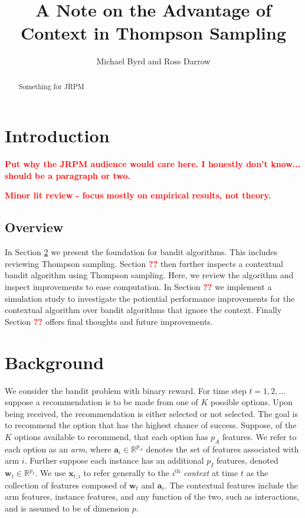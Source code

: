 \documentclass[12pt]{article}
\title{A Note on the Advantage of Context in Thompson Sampling}
\author{Michael Byrd and Ross Darrow}
\newcommand{\bred}[1]{\textbf{\textcolor{red}{#1}}}
\begin{document}
\maketitle

\begin{abstract}
Something for JRPM
\end{abstract}

\section{Introduction}

\bred{Put why the JRPM audience would care here. I honestly don't know... should
be a paragraph or two.}

\bred{Minor lit review - focus mostly on empirical results, not theory.}

\subsection{Overview}

In Section \ref{sec:background} we present the foundation for bandit algorithms.
This includes reviewing Thompson sampling.  
Section \bred{??} then further inspects a contextual bandit algorithm using 
Thompson sampling. 
Here, we review the algorithm and inspect improvements to ease computation.
In Section \bred{??} we implement a simulation study to investigate the potiential 
performance improvements for the contextual algorithm over bandit algorithms that
ignore the context.
Finally Section \bred{??} offers final thoughts and future improvements.


\section{Background} \label{sec:background}


We consider the bandit problem with binary reward.
For time step $t = 1, 2, \ldots$ suppose a recommendation is to be made from one 
of $K$ possible options.
Upon being received, the recommendation is either selected or not selected.
The goal is to recommend the option that has the highest chance of success.
Suppose, of the $K$ options available to recommend, that each option has $p_A$ 
features.
We refer to each option as an \textit{arm}, where 
$\bm{a}_i \in \mathbb{R}^{p_A}$
denotes the set of features associated with arm $i$. 
Further suppose each instance has an additional $p_I$ features, denoted 
$\bm{w}_t \in \mathbb{R}^{p_I}$.
We use $\bm{x}_{t,i}$ to refer generally to the $i^{\text{th}}$ \textit{context} 
at time $t$ as the collection of features composed of $\bm{w}_t$ and $\bm{a}_i$. 
The contextual features include the arm features, instance features, and any 
function of the two, such as interactions, and is assumed to be of dimension $p$.
\end{document}
